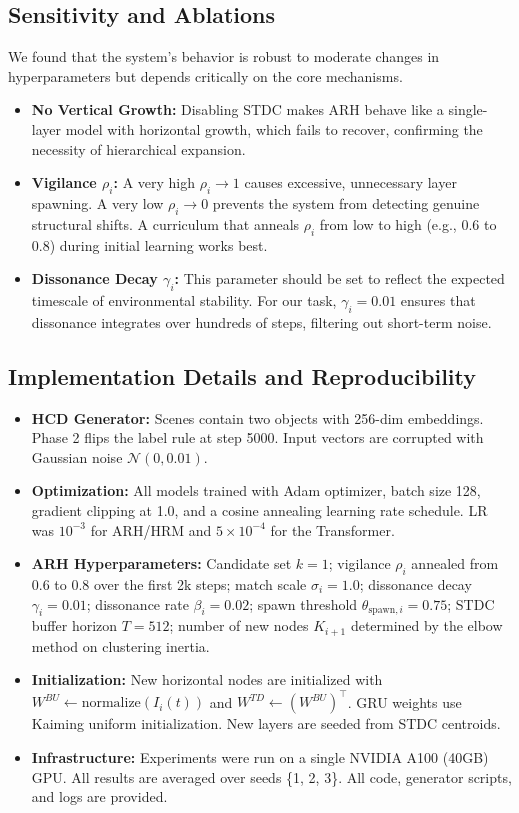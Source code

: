 \documentclass{article}
\begin{document}
\subsection{Sensitivity and Ablations}
We found that the system's behavior is robust to moderate changes in hyperparameters but depends critically on the core mechanisms.
\begin{itemize}
    \item \textbf{No Vertical Growth:} Disabling STDC makes ARH behave like a single-layer model with horizontal growth, which fails to recover, confirming the necessity of hierarchical expansion.
    \item \textbf{Vigilance $\rho_i$:} A very high $\rho_i \to 1$ causes excessive, unnecessary layer spawning. A very low $\rho_i \to 0$ prevents the system from detecting genuine structural shifts. A curriculum that anneals $\rho_i$ from low to high (e.g., 0.6 to 0.8) during initial learning works best.
    \item \textbf{Dissonance Decay $\gamma_i$:} This parameter should be set to reflect the expected timescale of environmental stability. For our task, $\gamma_i=0.01$ ensures that dissonance integrates over hundreds of steps, filtering out short-term noise.
\end{itemize}

\subsection{Implementation Details and Reproducibility}
\begin{itemize}
    \item \textbf{HCD Generator:} Scenes contain two objects with 256-dim embeddings. Phase 2 flips the label rule at step 5000. Input vectors are corrupted with Gaussian noise $\mathcal{N}(0, 0.01)$.
    \item \textbf{Optimization:} All models trained with Adam optimizer, batch size 128, gradient clipping at 1.0, and a cosine annealing learning rate schedule. LR was $10^{-3}$ for ARH/HRM and $5 \times 10^{-4}$ for the Transformer.
    \item \textbf{ARH Hyperparameters:} Candidate set $k=1$; vigilance $\rho_i$ annealed from 0.6 to 0.8 over the first 2k steps; match scale $\sigma_i=1.0$; dissonance decay $\gamma_i=0.01$; dissonance rate $\beta_i=0.02$; spawn threshold $\theta_{\text{spawn},i}=0.75$; STDC buffer horizon $T=512$; number of new nodes $K_{i+1}$ determined by the elbow method on clustering inertia.
    \item \textbf{Initialization:} New horizontal nodes are initialized with $W^{BU} \leftarrow \text{normalize}(I_i(t))$ and $W^{TD} \leftarrow (W^{BU})^\top$. GRU weights use Kaiming uniform initialization. New layers are seeded from STDC centroids.
    \item \textbf{Infrastructure:} Experiments were run on a single NVIDIA A100 (40GB) GPU. All results are averaged over seeds \{1, 2, 3\}. All code, generator scripts, and logs are provided.
\end{itemize}
\end{document}
